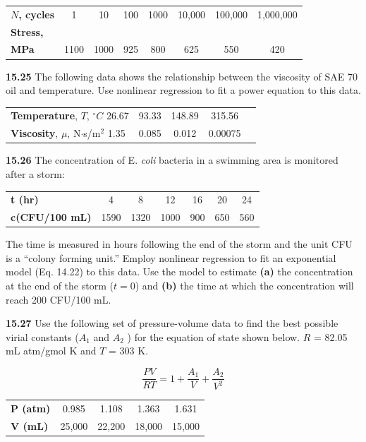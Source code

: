 \documentclass[../main.tex]{subfiles}
\begin{document}
\begin{multicols}{2}
	\noindent
	\begin{tabular}{l c c c c c c c}
		\textbf{$N$, cycles} &1 & 10 &100 &1000& 10,000& 100,000& 1,000,000\\
		\textbf{Stress,} \\
		\textbf{MPa} & 1100 & 1000 & 925 & 800 &	625 &	550 &	420
	\end{tabular}

	\noindent\textbf{15.25} The following data shows the relationship between the viscosity of SAE 70 oil and temperature. Use nonlinear regression to fit a power equation to this data.

	\noindent
	\begin{tabular}{l c c c c}
		\textbf{Temperature}, $T$, $^\circ C$ 26.67 & 93.33 & 148.89 & 315.56 \\
		\textbf{Viscosity}, $\mu$, N$\cdot$s/m$^2$ 1.35 & 0.085 & 0.012 & 0.00075
	\end{tabular}

	\noindent\textbf{15.26} The concentration of E. \textit{coli} bacteria in a swimming
	area is monitored after a storm:

	\noindent
	\begin{tabular}{l c c c c c c}
		\textbf{t (hr)} &	4 &	8 &	12 &	16 &	20 &	24 \\
		\textbf{c(CFU/100 mL)} &	1590 &	1320 &	1000 &	900 &	650 &	560	   
	\end{tabular}

	\noindent The time is measured in hours following the end of the storm
and the unit CFU is a ``colony forming unit.'' Employ nonlinear regression to fit an exponential model (Eq. 14.22) to
this data. Use the model to estimate \textbf{(a)} the concentration at
the end of the storm ($t = 0$) and \textbf{(b)} the time at which the
concentration will reach 200 CFU/100 mL.

	\noindent\textbf{15.27} Use the following set of pressure-volume data to
	find the best possible virial constants ($A_1$ and $A_2$ ) for the
	equation of state shown below. $R$ = 82.05 mL atm/gmol K
	and $T$ = 303 K.

	$$
		\frac{PV}{RT} = 1 + \frac{A_1}{V} + \frac{A_2}{V^2}
	$$
   
	\noindent
	\begin{tabular}{l c c c c}
		\textbf{P (atm)} & 0.985 & 1.108 & 1.363 & 1.631 \\
		\textbf{V (mL)} & 25,000 & 22,200 & 18,000 & 15,000
	\end{tabular}


\end{multicols}
\end{document}
